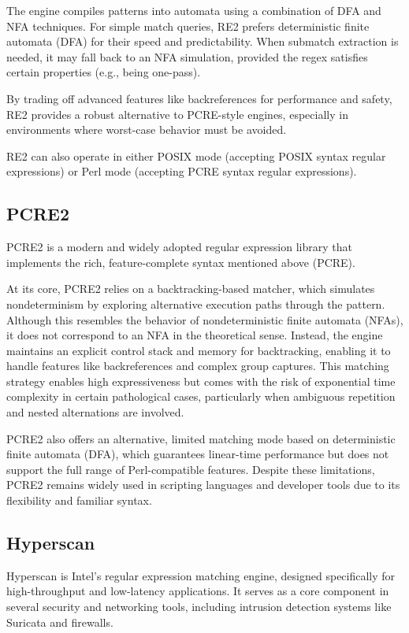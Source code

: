 The engine compiles patterns into automata using a combination of DFA and NFA techniques. For simple match queries, RE2 prefers deterministic finite automata (DFA) for their speed and predictability. When submatch extraction is needed, it may fall back to an NFA simulation, provided the regex satisfies certain properties (e.g., being one-pass). \cite{russ_cox_regexp3}

By trading off advanced features like backreferences for performance and safety, RE2 provides a robust alternative to PCRE-style engines, especially in environments where worst-case behavior must be avoided.

RE2 can also operate in either POSIX mode (accepting POSIX syntax regular expressions) or Perl mode (accepting PCRE syntax regular expressions). \cite{russ_cox_re2}

\subsection{PCRE2}
PCRE2 is a modern and widely adopted regular expression library that implements the rich, feature-complete syntax mentioned above (PCRE). \cite{sw_pcre2}

At its core, PCRE2 relies on a backtracking-based matcher, which simulates nondeterminism by exploring alternative execution paths through the pattern. Although this resembles the behavior of nondeterministic finite automata (NFAs), it does not correspond to an NFA in the theoretical sense. Instead, the engine maintains an explicit control stack and memory for backtracking, enabling it to handle features like backreferences and complex group captures. This matching strategy enables high expressiveness but comes with the risk of exponential time complexity in certain pathological cases, particularly when ambiguous repetition and nested alternations are involved. \cite{sw_pcre2}

PCRE2 also offers an alternative, limited matching mode based on deterministic finite automata (DFA), which guarantees linear-time performance but does not support the full range of Perl-compatible features. Despite these limitations, PCRE2 remains widely used in scripting languages and developer tools due to its flexibility and familiar syntax. \cite{sw_pcre2}

\subsection{Hyperscan}
Hyperscan is Intel’s regular expression matching engine, designed specifically for high-throughput and low-latency applications. It serves as a core component in several security and networking tools, including intrusion detection systems like Suricata and firewalls.


